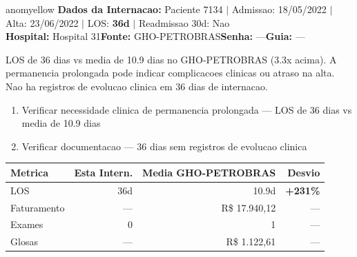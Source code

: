 \documentclass[a4paper,10pt]{article}
\begin{document}
\begin{anomalycard}[Internacao 7050 | GHO-PETROBRAS | MODERADO (z=2.15)]{anomyellow}
\textbf{Dados da Internacao:} Paciente 7134 $\mid$ Admissao: 18/05/2022 $\mid$ Alta: 23/06/2022 $\mid$ LOS: \textbf{36d} $\mid$ Readmissao 30d: Nao\\
\textbf{Hospital:} Hospital 31\quad\textbf{Fonte:} GHO-PETROBRAS\quad\textbf{Senha:} ---\quad\textbf{Guia:} ---\\
\vspace{2pt}\begin{tcolorbox}[colback=severityred!20,colframe=anomyellow,title={\textbf{Interpretacao de Negocio}},fonttitle=\bfseries\small,left=4pt,right=4pt,top=3pt,bottom=3pt]
{\small LOS de 36 dias vs media de 10.9 dias no GHO-PETROBRAS (3.3x acima). A permanencia prolongada pode indicar complicacoes clinicas ou atraso na alta. Nao ha registros de evolucao clinica em 36 dias de internacao.}
\end{tcolorbox}
\begin{tcolorbox}[colback=severityyellow!30,colframe=anomorange,title={\textbf{Recomendacoes Especificas}},fonttitle=\bfseries\small,left=4pt,right=4pt,top=3pt,bottom=3pt]
\begin{enumerate}[nosep,leftmargin=16pt]
\item {\small Verificar necessidade clinica de permanencia prolongada --- LOS de 36 dias vs media de 10.9 dias}
\item {\small Verificar documentacao --- 36 dias sem registros de evolucao clinica}
\end{enumerate}
\end{tcolorbox}
\begin{center}\begin{tabular}{l r r r}\toprule\textbf{Metrica} & \textbf{Esta Intern.} & \textbf{Media GHO-PETROBRAS} & \textbf{Desvio} \\\midrule
LOS & 36d & 10.9d & \textcolor{anomred}{\textbf{+231\%}} \\
Faturamento & --- & R\$ 17.940,12 & --- \\
Exames & 0 & 1 & --- \\
Glosas & --- & R\$ 1.122,61 & --- \\
\bottomrule\end{tabular}\end{center}


\end{anomalycard}
\end{document}
